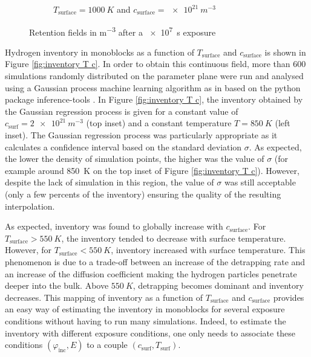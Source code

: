 \begin{figure}
\begin{subfigure}{0.5\linewidth}
        \caption{$T_\mathrm{surface} = \SI{1000}{K}$ and $c_\mathrm{surface} = \SI{e21}{m^{-3}}$}
    \end{subfigure}
    \caption{Retention fields in \si{m^{-3}} after a \SI{e7}{s} exposure}
    \label{fig:retention fields}
\end{figure}


Hydrogen inventory in monoblocks as a function of $T_\mathrm{surface}$ and $c_\mathrm{surface}$ is shown in Figure \ref{fig:inventory T c}.
In order to obtain this continuous field, more than 600 simulations randomly distributed on the parameter plane were run and analysed using a Gaussian process machine learning algorithm \cite{rasmussen_gaussian_2006} as in \cite{shimwell_multiphysics_2019} based on the python package inference-tools \cite{chris_bowman_c-bowmaninference-tools_2020}.
In Figure \ref{fig:inventory T c}, the inventory obtained by the Gaussian regression process is given for a constant value of $c_\mathrm{surf}=\SI{2e21}{m^{-3}}$ (top inset) and a constant temperature $T=\SI{850}{K}$ (left inset).
The Gaussian regression process was particularly appropriate as it calculates a confidence interval based on the standard deviation $\sigma$.
As expected, the lower the density of simulation points, the higher was the value of $\sigma$ (for example around \SI{850}{K} on the top inset of Figure \ref{fig:inventory T c}).
However, despite the lack of simulation in this region, the value of $\sigma$ was still acceptable (only a few percents of the inventory) ensuring the quality of the resulting interpolation.

As expected, inventory was found to globally increase with $c_\mathrm{surface}$.
For $T_\mathrm{surface} > \SI{550}{K}$, the inventory tended to decrease with surface temperature.
However, for $T_\mathrm{surface} < \SI{550}{K}$, inventory increased with surface temperature.
This phenomenon is due to a trade-off between an increase of the detrapping rate and an increase of the diffusion coefficient making the hydrogen particles penetrate deeper into the bulk.
Above $\SI{550}{K}$, detrapping becomes dominant and inventory decreases.
This mapping of inventory as a function of $T_\mathrm{surface}$ and $c_\mathrm{surface}$ provides an easy way of estimating the inventory in monoblocks for several exposure conditions without having to run many simulations.
Indeed, to estimate the inventory with different exposure conditions, one only needs to associate these conditions $(\varphi_\mathrm{inc}, E)$ to a couple $(c_\mathrm{surf}, T_\mathrm{surf})$.

